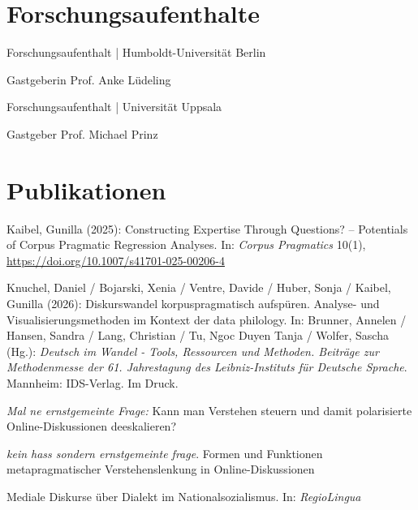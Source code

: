 \documentclass[11pt, a4paper, notopicbreak, titleabove]{simplecv}
\begin{document}
\section{Forschungsaufenthalte}

\begin{topic}
	\item[2025]
		Forschungsaufenthalt {\color{SpotColor}|} Humboldt-Universität Berlin \par
		\begingroup
			\color{QueenslandGrey}\small%
			\selectfont%
			Gastgeberin Prof. Anke Lüdeling \\  
		\endgroup
	\item[2025]
		Forschungsaufenthalt {\color{SpotColor}|} Universität Uppsala \par
		\begingroup
			\color{QueenslandGrey}\small%
			\selectfont%
			Gastgeber Prof. Michael Prinz \\  
		\endgroup

	

\end{topic}



\section{Publikationen}

\begin{topic}

	\item[Aufsatz]
    Kaibel, Gunilla (2025): Constructing Expertise Through Questions? -- Potentials of Corpus Pragmatic Regression Analyses. In: \textit{Corpus Pragmatics} 10(1), \url{https://doi.org/10.1007/s41701-025-00206-4}

	\item[Aufsatz]
    Knuchel, Daniel / Bojarski, Xenia / Ventre, Davide / Huber, Sonja / Kaibel, Gunilla (2026): Diskurswandel korpuspragmatisch aufspüren. Analyse- und Visualisierungsmethoden im Kontext der data philology. In: Brunner, Annelen / Hansen, Sandra / Lang, Christian / Tu, Ngoc Duyen Tanja / Wolfer, Sascha (Hg.): \textit{Deutsch im Wandel - Tools, Ressourcen und Methoden. Beiträge zur Methodenmesse der 61. Jahrestagung des Leibniz-Instituts für Deutsche Sprache}. Mannheim: IDS-Verlag. Im Druck.

	\item[In Begutachtung]
	\textit{Mal ne ernstgemeinte Frage:} Kann man Verstehen steuern und damit polarisierte Online-Diskussionen deeskalieren?

	\item[In Begutachtung]
	\textit{kein hass sondern ernstgemeinte frage}. Formen und Funktionen metapragmatischer Verstehenslenkung in Online-Diskussionen

	\item[In Begutachtung]
	Mediale Diskurse über Dialekt im Nationalsozialismus. In: \textit{RegioLingua}

\end{topic}
\end{document}
